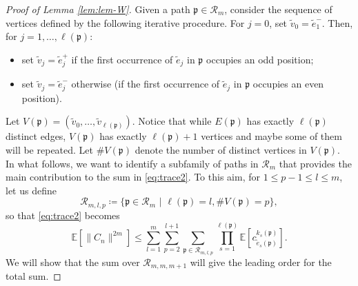 \documentclass[11pt,oneside]{amsart}
\theoremstyle{plain}
\numberwithin{equation}{section}
\newcommand{\E}{\mathbb{E}}
\newcommand{\centeredentry}{{c}}
\newcommand{\centered}{C_n}
\newcommand{\pat}{\mathfrak{p}}
\begin{document}
\begin{proof}[Proof of Lemma \ref{lem:lem-W}] Given a path $\pat \in \mathcal{R}_m$, consider the sequence of vertices defined by the following iterative procedure. 
For $j=0$, set $\tilde{v}_0=\tilde{e}_1^-$. Then, for $j=1,\dots,{\ell(\pat)}$: 
\begin{itemize}
\item set $\tilde{v}_j=\tilde{e}_j^+$ if the first occurrence of $\tilde{e}_j$ in $\pat$ occupies an odd position;
\item set $\tilde{v}_j=\tilde{e}_j^-$ otherwise (if the first occurrence of $\tilde{e}_j$ in $\pat$ occupies an even position).
\end{itemize}
Let $V(\pat)=(\tilde{v}_0,\dots,\tilde{v}_{\ell(\pat)})$. 
Notice that while $E(\pat)$ has exactly ${\ell(\pat)}$ distinct edges, $V(\pat)$ has exactly ${\ell(\pat)}+1$ vertices and maybe some of them will be repeated. Let $\#V(\pat)$ denote the number of distinct vertices in $V(\pat)$. \\


In what follows, we want to identify a subfamily of paths in $\mathcal{R}_m$ that provides the main contribution to the sum in \eqref{eq:trace2}. To this aim, for $1\le p-1\le l\le m $, let us define
\begin{equation}
    \mathcal{R}_{m,l,p}\coloneq \{\pat \in \mathcal{R}_m \,\, | \,\, {\ell(\pat)}= l, \#V(\pat)=p\},
\end{equation}
so that \eqref{eq:trace2} becomes
\begin{equation} \label{eq:trace3}
    \E[\|\centered\|^{2m}] \le\sum_{l=1}^m \sum_{p=2}^{l+1}\sum_{\pat \in \mathcal{R}_{m,l,p}} \prod_{s=1}^{{\ell(\pat)}} \E\left[\centeredentry_{\tilde{e}_s(\pat)}^{k_s(\pat)}\right].
\end{equation}
We will show that the sum over $\mathcal{R}_{m,m,m+1}$ will give the leading order for the total sum.


\end{proof}
\end{document}
